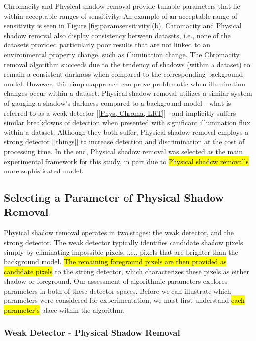 Chromacity and Physical shadow removal provide tunable parameters that lie within acceptable ranges of sensitivity. An example of an acceptable range of sensitivity is seen in Figure \ref{fig:paramsensitivity}(b). Chromacity and Physical shadow removal also display consistency between datasets, i.e., none of the datasets provided particularly poor results that are not linked to an environmental property change, such as illumination change. The Chromacity removal algorithm succeeds due to the tendency of shadows (within a dataset) to remain a consistent darkness when compared to the corresponding background model. However, this simple approach can prove problematic when illumination changes occur within a dataset. Physical shadow removal utilizes a similar system of gauging a shadow's darkness compared to a background model - what is referred to as a weak detector [\ref{Phys, Chroma, LRT}] - and implicitly suffers similar breakdowns of detection when presented with significant illumination flux within a dataset. Although they both suffer, Physical shadow removal employs a strong detector [\ref{things}] to increase detection and discrimination at the cost of processing time. In the end, Physical shadow removal was selected as the main experimental framework for this study, in part due to \hl{Physical shadow removal's} more sophisticated model.

\subsection{Selecting a Parameter of Physical Shadow Removal} \label{section:selectparameter}

Physical shadow removal operates in two stages: the weak detector, and the strong detector. The weak detector typically identifies candidate shadow pixels simply by eliminating impossible pixels, i.e., pixels that are brighter than the background model. \hl{The remaining foreground pixels are then provided as candidate pixels} to the strong detector, which characterizes these pixels as either shadow or foreground. Our assessment of algorithmic parameters explores parameters in both of these detector spaces. Before we can illustrate which parameters were considered for experimentation, we must first understand \hl{each parameter's} place within the algorithm.

\subsubsection{Weak Detector - Physical Shadow Removal}

